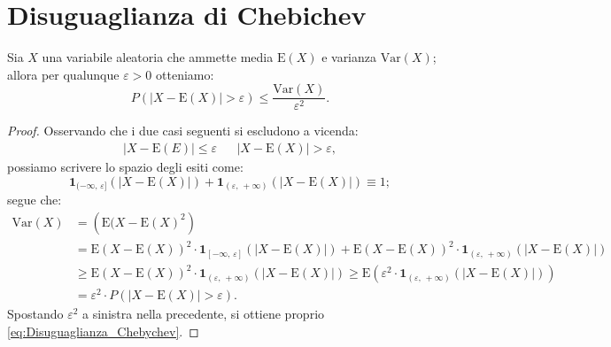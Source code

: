     \section{Disuguaglianza di Chebichev}
        \begin{defn}\label{defn:Disuguaglianza_Chebychev}
            Sia $X$ una variabile aleatoria che ammette media $\text{E}(X)$ e varianza $\text{Var}(X)$; allora per qualunque $\varepsilon > 0$ otteniamo:
            \begin{equation}\label{eq:Disuguaglianza_Chebychev}
                P\left(\left|X - \text{E}(X)\right| > \varepsilon\right) \leq \frac{\text{Var}(X)}{\varepsilon^2}
            .\end{equation}
        \end{defn}
        \begin{proof}
            Osservando che i due casi seguenti si escludono a vicenda:
            \begin{align*}
                \left|X - \text{E}(E)\right| \leq \varepsilon & & \left|X - \text{E}(X)\right| > \varepsilon
            ,\end{align*}
            possiamo scrivere lo spazio degli esiti come: \[
                \mathbf{1}_{(-\infty,\,\varepsilon]}(|X - \text{E}(X)|) + \mathbf{1}_{(\varepsilon,\,+\infty)}(|X - \text{E}(X)|) \equiv 1
            ;\] segue che:
            \begin{align*}
                \text{Var}(X) &= \left(\text{E}(X - \text{E}(X)^2\right) \\
                              &= \text{E}(X - \text{E}(X))^2 \cdot \mathbf{1}_{[-\infty,\,\varepsilon]}(|X - \text{E}(X)|) + \text{E}(X - \text{E}(X))^2 \cdot \mathbf{1}_{(\varepsilon,\,+\infty)}(|X - \text{E}(X)|) \\
                              &\geq \text{E}(X - \text{E}(X))^2 \cdot \mathbf{1}_{(\varepsilon,\,+\infty)}(|X - \text{E}(X)|) \geq \text{E}(\varepsilon^2 \cdot \mathbf{1}_{(\varepsilon,\,+\infty)}(|X - \text{E}(X)|)) \\
                              &= \varepsilon^2 \cdot P(|X - \text{E}(X)| > \varepsilon)
            .\end{align*}
            Spostando $\varepsilon^2$ a sinistra nella precedente, si ottiene proprio \eqref{eq:Disuguaglianza_Chebychev}.
        \end{proof}

